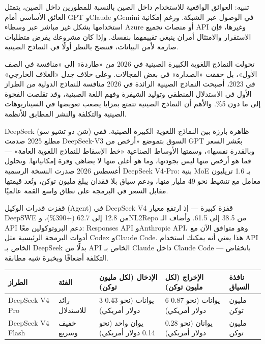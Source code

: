\begin{tcbwarn}{تنبيه: العوائق الواقعية للاستخدام داخل الصين}
بالنسبة للمطورين داخل الصين، يتمثل العائق الأساسي أمام GPT وClaude وGemini في الوصول عبر الشبكة. ورغم إمكانية استخدامها بشكل غير مباشر عبر وسطاء Azure أو منصات تجميع API وغيرها، فإن الاستقرار والامتثال أمران ينبغي تقييمهما بنفسك. وإذا كان مشروعك يفرض متطلبات صارمة لأمن البيانات، فننصح بالنظر أولًا في النماذج الصينية.

\end{tcbwarn}


تحولت النماذج اللغوية الكبيرة الصينية في 2026 من «طاردة» إلى «منافسة في الصف الأول»، بل حققت «الصدارة» في بعض المجالات. وعلى خلاف جدل «الغلاف الخارجي» في 2023، أصبحت النماذج الصينية الرائدة في 2026 منافسة للنماذج الدولية من الطراز الأول في الاستدلال المنطقي وتوليد الشيفرة وفهم اللغة الصينية، وقد تقلصت الفجوة إلى ما دون 5\%. والأهم أن النماذج الصينية تتمتع بمزايا يصعب تعويضها في السيناريوهات الصينية والتكلفة والنشر المطابق للأنظمة.


DeepSeek (شن دو تشيو سو) ظاهرة بارزة بين النماذج اللغوية الكبيرة الصينية. ففي مطلع 2025 صدمت DeepSeek-V3 السوق بتموضع «أرخص من GPT بعُشر السعر وبالقدرة نفسها»، وسمتها الأوساط الصناعية «خط الإسقاط للنماذج اللغوية العامة» — فما هو أرخص منها ليس بجودتها، وما هو أغلى منها لا يضاهي وفرة إمكانياتها. وبحلول أغسطس 2026 صدرت النسخة الرسمية DeepSeek V4-Pro: بنية MoE بـ 1.6 تريليون معامل مع تنشيط نحو 49 مليار منها، ودعم سياق بلا فقدان يبلغ مليون توكن، وتُعد قيمتها مقابل السعر في البرمجة على نطاق واسع القمة عالميًا.

قفزت قدرات الوكيل (Agent) في DeepSeek V4 قفزة كبيرة — إذ ارتفع معيار DeepSWE من 12.8 إلى 62.7 (+390\%)، وNL2Repo من 38.5 إلى 61.5. وأضاف الـ API دعم البروتوكولين معًا: Responses API وAnthropic API، وهو متوافق الآن مع أدوات البرمجة الرئيسية مثل Codex وClaude Code. هذا يعني أنه يمكنك استخدام API الخاص بـ DeepSeek بدلًا من API الخاص بـ Claude داخل Claude Code — بانخفاض التكلفة أضعافًا وبخبرة شبه مطابقة.

\begin{center}
\begin{tabularx}{\linewidth}{|X|X|X|X|X|}
\hline
\textbf{الطراز} & \textbf{الفئة} & \textbf{الإدخال (لكل مليون توكن)} & \textbf{الإخراج (لكل مليون توكن)} & \textbf{نافذة السياق} \tabularnewline
\hline
DeepSeek V4 Pro & رائد للاستدلال & 3 يوانات (نحو 0.43 دولار أمريكي) & 6 يوانات (نحو 0.87 دولار أمريكي) & مليون توكن \tabularnewline
DeepSeek V4 Flash & خفيف وسريع & يوان واحد (نحو 0.14 دولار أمريكي) & يوانان (نحو 0.28 دولار أمريكي) & مليون توكن \tabularnewline
\hline
\end{tabularx}
\end{center}

